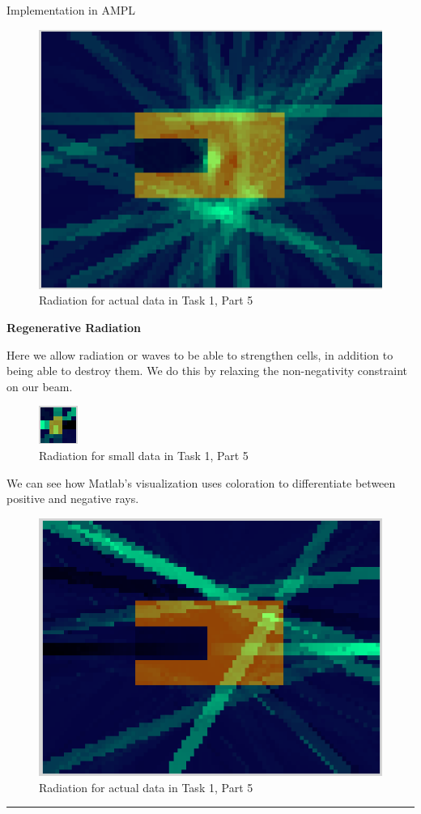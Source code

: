 \documentclass[12pt]{article}
\makeatletter
\newenvironment{task}{\@startsection
       {section}{1}
       {0.4em}{-.5ex plus -1ex minus -.2ex}{.5ex plus .2ex}
       {\pagebreak[3]\large\bf\noindent{Task}}}
       {\nopagebreak[3]\vspace{3ex}\begin{center}\rule{1\linewidth}{.3pt}\end{center}}
\makeatother
\begin{document}
\begin{task}{Implementation in AMPL}
\begin{enumerate}
\begin{figure} [H]
	\centering
	\includegraphics[scale = 0.8] {visualization5_rad_actual.png} 
	\caption{Radiation for actual data in Task 1, Part 5}
\end{figure}

\textbf{Regenerative Radiation}

Here we allow radiation or waves to be able to strengthen cells, in addition to being able to destroy them. We do this by relaxing the non-negativity constraint on our beam. 

\begin{figure} [H]
	\centering
	\includegraphics[scale = 3.0] {visualization5_pos_small.png} 
	\caption{Radiation for small data in Task 1, Part 5}
\end{figure}

We can see how Matlab's visualization uses coloration to differentiate between positive and negative rays. 

\begin{figure} [H]
	\centering
	\includegraphics[scale = 0.8] {visualization5_pos_actual.png} 
	\caption{Radiation for actual data in Task 1, Part 5}
\end{figure}


\end{enumerate}
\end{task}
\end{document}
